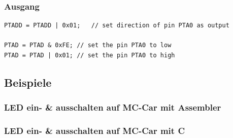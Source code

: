 \subsubsection{Ausgang}
\begin{lstlisting}
PTADD = PTADD | 0x01;	// set direction of pin PTA0 as output

PTAD = PTAD & 0xFE;	// set the pin PTA0 to low
PTAD = PTAD | 0x01;	// set the pin PTA0 to high
\end{lstlisting}

\newpage
\subsection{Beispiele}

\subsubsection{LED ein- \& ausschalten auf MC-Car mit Assembler}


\newpage
\subsubsection{LED ein- \& ausschalten auf MC-Car mit C}

